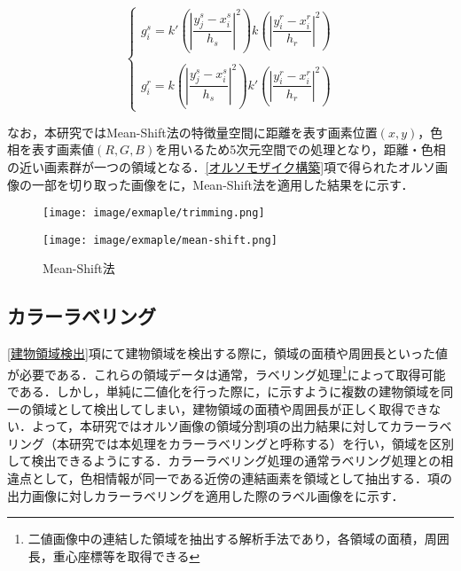      \begin{equation}
        \label{Mean-Shift法3}
        \left\{
          \begin{array}{l}
            g_{i}^s = k' (|\dfrac{y_{j}^s - x_{i}^s} {h_{s}}|^2)
              k  (|\dfrac{y_{i}^r - x_{i}^r} {h_{r}}|^2) \\ \\
            g_{i}^r = k  (|\dfrac{y_{j}^s - x_{i}^s} {h_{s}}|^2) 
              k' (|\dfrac{y_{i}^r - x_{i}^r} {h_{r}}|^2)
          \end{array}
        \right.
      \end{equation}

      なお，本研究ではMean-Shift法の特徴量空間に距離を表す画素位置$(x,y)$，色相を表す画素値$(R,G,B)$を用いるため5次元空間での処理となり，距離・色相の近い画素群が一つの領域となる．\ref{オルソモザイク構築}項で得られたオルソ画像の一部を切り取った画像をに，Mean-Shift法を適用した結果をに示す．

      \begin{figure}[t]
        \begin{minipage}[c]{0.45\hsize}
          \centering
          \texttt{[image: image/exmaple/trimming.png]}
          \label{Mean−Shift法入力}
        \end{minipage}
        \begin{minipage}[c]{0.45\hsize}
          \centering
          \texttt{[image: image/exmaple/mean-shift.png]}
          \label{Mean-Shift法出力}
        \end{minipage}
        \caption{Mean-Shift法}
      \end{figure}


    \subsection{カラーラベリング}
      \label{カラーラベリング}
      \ref{建物領域検出}項にて建物領域を検出する際に，領域の面積や周囲長といった値が必要である．これらの領域データは通常，ラベリング処理\footnote{二値画像中の連結した領域を抽出する解析手法であり，各領域の面積，周囲長，重心座標等を取得できる}によって取得可能である．しかし，単純に二値化を行った際に，に示すように複数の建物領域を同一の領域として検出してしまい，建物領域の面積や周囲長が正しく取得できない．よって，本研究では{オルソ画像の領域分割}項の出力結果に対してカラーラベリング（本研究では本処理をカラーラベリングと呼称する）を行い，領域を区別して検出できるようにする．カラーラベリング処理の通常ラベリング処理との相違点として，色相情報が同一である近傍の連結画素を領域として抽出する．項の出力画像に対しカラーラベリングを適用した際のラベル画像をに示す．

